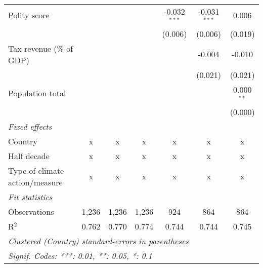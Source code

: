 \begin{tabular}{lcccccc}
   Polity score                                                     &         &               &               & -0.032$^{***}$ & -0.031$^{***}$ & 0.006\\   
                                                                    &         &               &               & (0.006)        & (0.006)        & (0.019)\\   
   Tax revenue (\% of GDP)                                          &         &               &               &                & -0.004         & -0.010\\   
                                                                    &         &               &               &                & (0.021)        & (0.021)\\   
   Population total                                                 &         &               &               &                &                & 0.000$^{**}$\\   
                                                                    &         &               &               &                &                & (0.000)\\   
   \emph{Fixed effects}\\
   Country                                                          & x       & x             & x             & x              & x              & x\\  
   Half decade                                                      & x       & x             & x             & x              & x              & x\\  
   Type of climate action/measure                                   & x       & x             & x             & x              & x              & x\\  
   \midrule \emph{Fit statistics}\\
   Observations                                                     & 1,236   & 1,236         & 1,236         & 924            & 864            & 864\\  
   R$^2$                                                            & 0.762   & 0.770         & 0.774         & 0.744          & 0.744          & 0.745\\  
   \midrule
   \multicolumn{7}{l}{\emph{Clustered (Country) standard-errors in parentheses}}\\
   \multicolumn{7}{l}{\emph{Signif. Codes: ***: 0.01, **: 0.05, *: 0.1}}\\
\end{tabular}
\par\endgroup


